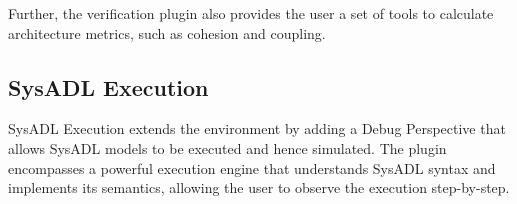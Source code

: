 Further, the verification plugin also provides the user a set of tools to calculate architecture metrics, such as cohesion and coupling.

\subsection{SysADL Execution}
SysADL Execution extends the environment by adding a Debug Perspective that allows SysADL models to be executed and hence simulated. The plugin encompasses a powerful execution engine that understands SysADL syntax and implements its semantics, allowing the user to observe the execution step-by-step.
